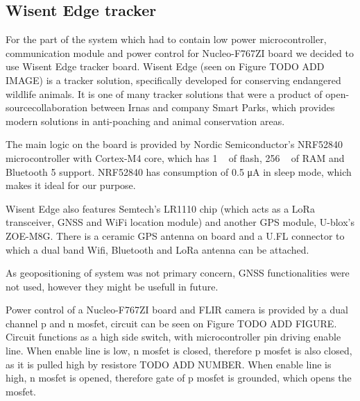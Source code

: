 \subsection{ Wisent Edge tracker}

For the part of the system which had to contain low power microcontroller, communication module and power control for Nucleo-F767ZI board we decided to use Wisent Edge tracker board.
Wisent Edge (seen on Figure TODO ADD IMAGE) is a tracker solution, specifically developed for conserving endangered wildlife animals.
It is one of many tracker solutions that were a product of open-source\footnotemark collaboration between Irnas and company Smart Parks, which provides modern solutions in anti-poaching and animal conservation areas.


The main logic on the board is provided by Nordic Semiconductor's NRF52840 microcontroller with Cortex-M4 core, which has 1 \si{\mega\byte} of flash, 256 \si{\kilo\byte} of RAM and Bluetooth 5 support.
NRF52840 has consumption of 0.5 \si{\micro\ampere} in sleep mode, which makes it ideal for our purpose.

Wisent Edge also features Semtech's LR1110 chip (which acts as a LoRa transceiver, GNSS and WiFi location module) and another GPS module, U-blox's ZOE-M8G\footnotemark.
There is a ceramic GPS antenna on board and a U.FL connector to which a dual band Wifi, Bluetooth and LoRa antenna can be attached.


As geopositioning of system was not primary concern, GNSS functionalities were not used, however they might be usefull in future.

Power control of a Nucleo-F767ZI board and FLIR camera is provided by a dual channel p and n mosfet, circuit can be seen on Figure TODO ADD FIGURE.
Circuit functions as a high side switch, with microcontroller pin driving enable line.
When enable line is low, n mosfet is closed, therefore p mosfet is also closed, as it is pulled high by resistore TODO ADD NUMBER.
When enable line is high, n mosfet is opened, therefore gate of p mosfet is grounded, which opens the mosfet.



